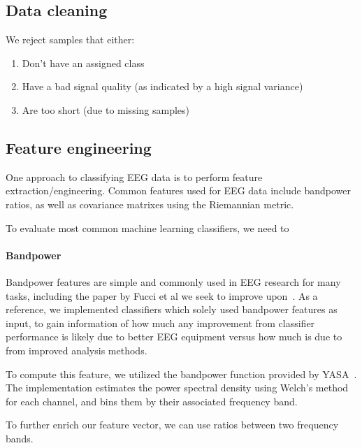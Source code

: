     \subsection{Data cleaning}

        We reject samples that either:

        \begin{enumerate}
            \item Don't have an assigned class
            \item Have a bad signal quality (as indicated by a high signal variance)
            \item Are too short (due to missing samples)
        \end{enumerate}


    \subsection{Feature engineering}

        One approach to classifying EEG data is to perform feature extraction/engineering. Common features used for EEG data include bandpower ratios, as well as covariance matrixes using the Riemannian metric.
        
        To evaluate most common machine learning classifiers, we need to 

        \paragraph{Bandpower}

            Bandpower features are simple and commonly used in EEG research for many tasks, including the paper by Fucci et al we seek to improve upon~\cite{fucci_replication_2019}. As a reference, we implemented classifiers which solely used bandpower features as input, to gain information of how much any improvement from classifier performance is likely due to better EEG equipment versus how much is due to from improved analysis methods.

            To compute this feature, we utilized the bandpower function provided by YASA~\cite{vallat_yasa_2020}. The implementation estimates the power spectral density using Welch's method for each channel, and bins them by their associated frequency band.

            To further enrich our feature vector, we can use ratios between two frequency bands.

